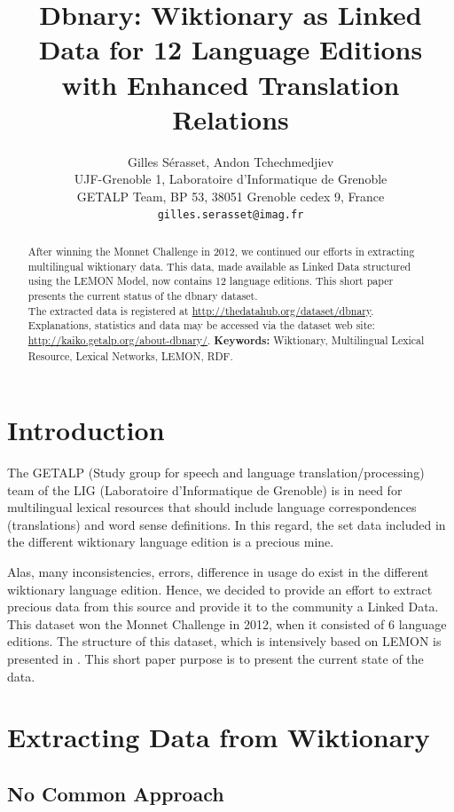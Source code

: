\documentclass[10pt, a4paper]{article}
\title{Dbnary: Wiktionary as Linked Data for 12 Language Editions with Enhanced Translation Relations}
\author{Gilles Sérasset, Andon Tchechmedjiev\\
UJF-Grenoble 1, Laboratoire d'Informatique de Grenoble\\ 
GETALP Team, BP 53, 38051 Grenoble cedex 9, France \\ 
\texttt{gilles.serasset@imag.fr}
\\}
\date{}
\begin{document}
\maketitle

\begin{abstract}
After winning the Monnet Challenge in 2012, we continued our efforts in extracting multilingual wiktionary data. This data, made available as Linked Data structured using the LEMON Model, now contains 12 language editions. This short paper presents the current status of the dbnary dataset.\\
The extracted data is registered at \url{http://thedatahub.org/dataset/dbnary}. Explanations, statistics and data may be accessed via the dataset web site: \url{http://kaiko.getalp.org/about-dbnary/}.
\textbf{Keywords:} Wiktionary, Multilingual Lexical Resource, Lexical Networks, LEMON, RDF.
\end{abstract}


\section{Introduction}

The GETALP (Study group for speech and language translation/processing) team of the LIG (Laboratoire d'Informatique de Grenoble) is in need for multilingual lexical resources that should include language correspondences (translations) and word sense definitions. In this regard, the set data included in the different wiktionary language edition is a precious mine.

Alas, many inconsistencies, errors, difference in usage do exist in the different wiktionary language edition. Hence, we decided to provide an effort to extract precious data from this source and provide it to the community a Linked Data. This dataset won the Monnet Challenge in 2012, when it consisted of 6 language editions. The structure of this dataset, which is intensively based on LEMON is presented in \cite{serasset:dbnary-swj}. This short paper purpose is to present the current state of the data.

\section{Extracting Data from Wiktionary}

\subsection{No Common Approach}
\end{document}
